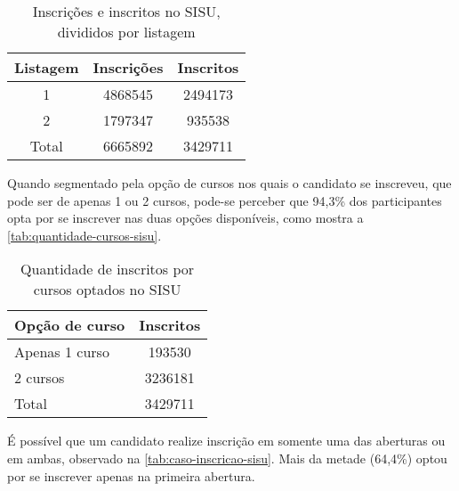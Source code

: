 \begin{table}[h]
  \begin{tabular}{ccc}
  \hline
  \multicolumn{1}{c}{\textbf{Listagem}} & \textbf{Inscrições} & \textbf{Inscritos} \\ \hline
  1                                     & 4868545                           & 2494173                          \\ \hline
  2                                     & 1797347                           & 935538                           \\ \hline
  Total                                 & 6665892                           & 3429711                          \\ \hline
  \end{tabular}
  \caption{Inscrições e inscritos no SISU, divididos por listagem}
  \label{tab:inscricoes-inscritos-sisu}
  \end{table}

Quando segmentado pela opção de cursos nos quais o candidato se inscreveu, que pode ser de apenas 1 ou 2 cursos, pode-se perceber que 94,3\% dos participantes opta por se inscrever nas duas opções disponíveis, como mostra a \autoref{tab:quantidade-cursos-sisu}.

  \begin{table}[h]
    \begin{tabular}{lc}
    \hline
    \textbf{Opção de curso} & \textbf{Inscritos} \\ \hline
    Apenas 1 curso          & 193530                           \\ \hline
    2 cursos                & 3236181                          \\ \hline
    Total                   & 3429711                          \\ \hline
    \end{tabular}
    \caption{Quantidade de inscritos por cursos optados no SISU}
    \label{tab:quantidade-cursos-sisu}
    \end{table}

\pagebreak

É possível que um candidato realize inscrição em somente uma das aberturas ou em ambas, observado na \autoref{tab:caso-inscricao-sisu}. Mais da metade (64,4\%) optou por se inscrever apenas na primeira abertura.

